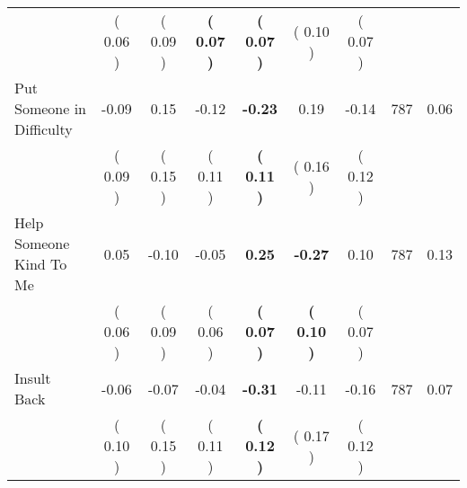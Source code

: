 \begin{tabular}{lcccccccc}
 & (     0.06 ) & (     0.09 ) & \textbf{(     0.07 )} & \textbf{(     0.07 )} & (     0.10 ) & (     0.07 ) & \\
Put Someone in Difficulty &     -0.09 &      0.15 &     -0.12 & \textbf{    -0.23} &      0.19 &     -0.14 & 787 &       0.06 \\ 
 & (     0.09 ) & (     0.15 ) & (     0.11 ) & \textbf{(     0.11 )} & (     0.16 ) & (     0.12 ) & \\
Help Someone Kind To Me &      0.05 &     -0.10 &     -0.05 & \textbf{     0.25} & \textbf{    -0.27} &      0.10 & 787 &       0.13 \\ 
 & (     0.06 ) & (     0.09 ) & (     0.06 ) & \textbf{(     0.07 )} & \textbf{(     0.10 )} & (     0.07 ) & \\
Insult Back &     -0.06 &     -0.07 &     -0.04 & \textbf{    -0.31} &     -0.11 &     -0.16 & 787 &       0.07 \\ 
 & (     0.10 ) & (     0.15 ) & (     0.11 ) & \textbf{(     0.12 )} & (     0.17 ) & (     0.12 ) & \\
\bottomrule
\end{tabular}
